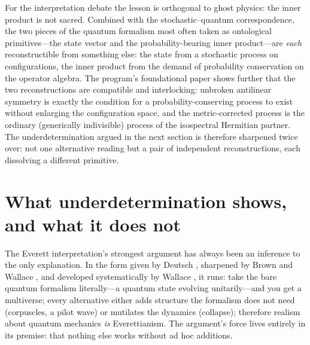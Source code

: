\documentclass[11pt]{article}
\theoremstyle{remark}
\begin{document}
For the interpretation debate the lesson is orthogonal to ghost
physics: the inner product is not sacred. Combined with the
stochastic--quantum correspondence, the two pieces of the quantum
formalism most often taken as ontological primitives---the state
vector and the probability-bearing inner product---are \emph{each}
reconstructible from something else: the state from a stochastic
process on configurations, the inner product from the demand of
probability conservation on the operator algebra. The program's
foundational paper \cite{indivisible} shows further that the two
reconstructions are compatible and interlocking: unbroken antilinear
symmetry is exactly the condition for a probability-conserving
process to exist without enlarging the configuration space, and the
metric-corrected process is the ordinary (generically indivisible)
process of the isospectral Hermitian partner. The underdetermination
argued in the next section is therefore sharpened twice over: not one
alternative reading but a pair of independent reconstructions, each
dissolving a different primitive.

\section{What underdetermination shows, and what it does not}
\label{sec:underdet}

The Everett interpretation's strongest argument has always been an
inference to the only explanation. In the form given by Deutsch
\cite{Deutsch1996}, sharpened by Brown and Wallace
\cite{BrownWallace}, and developed systematically by Wallace
\cite{Wallace2012}, it runs: take the bare quantum formalism
literally---a quantum state evolving unitarily---and you get a
multiverse; every alternative either adds structure the formalism
does not need (corpuscles, a pilot wave) or mutilates the dynamics
(collapse); therefore realism about quantum mechanics \emph{is}
Everettianism. The argument's force lives entirely in its premise:
that nothing else works without ad hoc additions.
\end{document}
